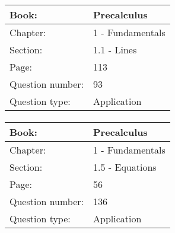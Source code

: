 \documentclass{article}
\begin{document}
   \paragraph{}
   \begin{tabularx}{1\textwidth}{
           p{}
           p{}
       }
       \toprule
       Book: & Precalculus
       \\
       \midrule
       Chapter: & 1 - Fundamentals
       \\
       \midrule
       Section: & 1.1 - Lines
       \\
       \midrule
       Page: & 113
       \\
       \midrule
       Question number: & 93
       \\
       \midrule
       Question type: & Application
       \\
       \bottomrule
   \end{tabularx}



   \paragraph{}
   \begin{tabularx}{1\textwidth}{
           p{}
           p{}
       }
       \toprule
       Book: & Precalculus
       \\
       \midrule
       Chapter: & 1 - Fundamentals
       \\
       \midrule
       Section: & 1.5 - Equations
       \\
       \midrule
       Page: & 56
       \\
       \midrule
       Question number: & 136
       \\
       \midrule
       Question type: & Application
       \\
       \bottomrule
   \end{tabularx}
\end{document}
